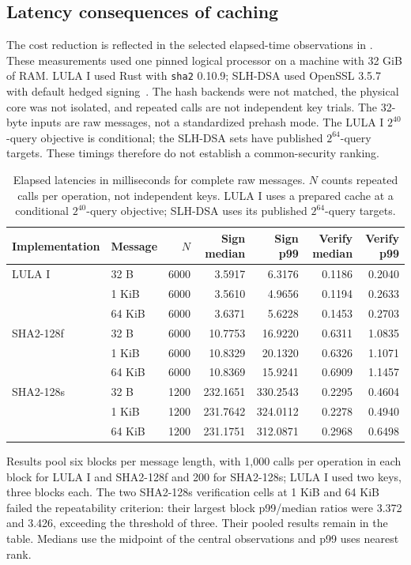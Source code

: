 \subsection{Latency consequences of caching}\label{sec:experiments}
The cost reduction is reflected in the selected elapsed-time observations in . These measurements used one pinned logical processor on a machine with 32 GiB of RAM. LULA I used Rust with \texttt{sha2} 0.10.9; SLH-DSA used OpenSSL 3.5.7 with default hedged signing~\cite{openssl}. The hash backends were not matched, the physical core was not isolated, and repeated calls are not independent key trials. The 32-byte inputs are raw messages, not a standardized prehash mode. The LULA I $2^{40}$-query objective is conditional; the SLH-DSA sets have published $2^{64}$-query targets. These timings therefore do not establish a common-security ranking.

\begin{table}[t]
\caption{Elapsed latencies in milliseconds for complete raw messages. $N$ counts repeated calls per operation, not independent keys. LULA I uses a prepared cache at a conditional $2^{40}$-query objective; SLH-DSA uses its published $2^{64}$-query targets.}\label{tab:eval-warm}
\centering\small\setlength{\tabcolsep}{3pt}
\begin{tabular}{llrrrrr}\toprule
Implementation & Message & $N$ & Sign median & Sign p99 & Verify median & Verify p99\\\midrule
LULA I &32 B&6000&3.5917&6.3176&0.1186&0.2040\\
&1 KiB&6000&3.5610&4.9656&0.1194&0.2633\\
&64 KiB&6000&3.6371&5.6228&0.1453&0.2703\\\midrule
SHA2-128f &32 B&6000&10.7753&16.9220&0.6311&1.0835\\
&1 KiB&6000&10.8329&20.1320&0.6326&1.1071\\
&64 KiB&6000&10.8369&15.9241&0.6909&1.1457\\\midrule
SHA2-128s &32 B&1200&232.1651&330.2543&0.2295&0.4604\\
&1 KiB&1200&231.7642&324.0112&0.2278&0.4940\\
&64 KiB&1200&231.1751&312.0871&0.2968&0.6498\\\bottomrule
\end{tabular}
\end{table}

Results pool six blocks per message length, with 1,000 calls per operation in each block for LULA I and SHA2-128f and 200 for SHA2-128s; LULA I used two keys, three blocks each. The two SHA2-128s verification cells at 1 KiB and 64 KiB failed the repeatability criterion: their largest block p99/median ratios were 3.372 and 3.426, exceeding the threshold of three. Their pooled results remain in the table. Medians use the midpoint of the central observations and p99 uses nearest rank.

